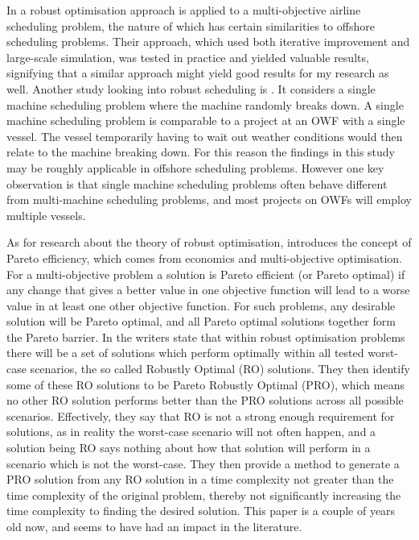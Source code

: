 \documentclass[a4paper,12pt]{article}
\begin{document}
In \cite{burke2010multi} a robust optimisation approach is applied to a multi-objective airline scheduling problem, the nature of which has certain similarities to offshore scheduling problems. Their approach, which used both iterative improvement and large-scale simulation, was tested in practice and yielded valuable results, signifying that a similar approach might yield good results for my research as well. 
Another study looking into robust scheduling is \cite{goren2008robustness}. It considers a single machine scheduling problem where the machine randomly breaks down. A single machine scheduling problem is comparable to a project at an OWF with a single vessel. The vessel temporarily having to wait out weather conditions would then relate to the machine breaking down. For this reason the findings in this study may be roughly applicable in offshore scheduling problems. However one key observation is that single machine scheduling problems often behave different from multi-machine scheduling problems, and most projects on OWFs will employ multiple vessels. 

As for research about the theory of robust optimisation, \cite{iancu2013pareto} introduces the concept of Pareto efficiency, which comes from economics and multi-objective optimisation. For a multi-objective problem a solution is Pareto efficient (or Pareto optimal) if any change that gives a better value in one objective function will lead to a worse value in at least one other objective function. For such problems, any desirable solution will be Pareto optimal, and all Pareto optimal solutions together form the Pareto barrier. In \cite{iancu2013pareto} the writers state that within robust optimisation problems there will be a set of solutions which perform optimally within all tested worst-case scenarios, the so called Robustly Optimal (RO) solutions. They then identify some of these RO solutions to be Pareto Robustly Optimal (PRO), which means no other RO solution performs better than the PRO solutions across all possible scenarios. Effectively, they say that RO is not a strong enough requirement for solutions, as in reality the worst-case scenario will not often happen, and a solution being RO says nothing about how that solution will perform in a scenario which is not the worst-case. They then provide a method to generate a PRO solution from any RO solution in a time complexity not greater than the time complexity of the original problem, thereby not significantly increasing the time complexity to finding the desired solution. This paper is a couple of years old now, and seems to have had an impact in the literature.
\end{document}
